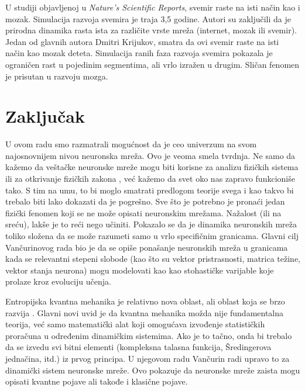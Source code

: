 \documentclass[a4paper]{article}
\begin{document}
U studiji objavljenoj u \textit{Nature’s Scientific Reports}, svemir raste na isti način kao i mozak. Simulacija razvoja svemira je traja 3,5 godine. Autori su zaključili da je prirodna dinamika rasta ista za različite vrste mreža (internet, mozak ili svemir). Jedan od glavnih autora Dmitri Krijukov, smatra da ovi svemir raste na isti način kao mozak deteta. Simulacija ranih faza razvoja svemira pokazala je ograničen rast u pojedinim segmentima, ali vrlo izražen u drugim. Sličan fenomen je prisutan u razvoju mozga. 

\section{Zaključak}

U ovom radu smo razmatrali mogućnost da je ceo univerzum na svom najosnovnijem nivou neuronska mreža. Ovo je veoma smela tvrdnja. Ne samo da kažemo da veštačke neuronske mreže mogu biti korisne za analizu fizičkih sistema \cite{2} ili za otkrivanje fizičkih zakona \cite{3}, već kažemo da svet oko nas zapravo funkcioniše tako. S tim na umu, to bi moglo smatrati predlogom teorije svega i kao takvo bi trebalo biti lako dokazati da je pogrešno. Sve što je potrebno je pronaći jedan fizički fenomen koji se ne može opisati neuronskim mrežama. Nažalost (ili na sreću), lakše je to reći nego učiniti. Pokazalo se da je dinamika neuronskih mreža toliko složena da se može razumeti samo u vrlo specifičnim granicama. Glavni cilj Vančurinovog rada bio je da se opiše ponašanje neuronskih mreža u granicama kada se relevantni stepeni slobode (kao što su vektor pristrasnosti, matrica težine, vektor stanja neurona) mogu modelovati kao kao stohastičke varijable koje prolaze kroz evoluciju učenja.

Entropijska kvantna mehanika je relativno nova \cite{4} oblast, ali oblast koja se brzo razvija \cite{5}. Glavni novi uvid je da kvantna mehanika možda nije fundamentalna teorija, već samo matematički alat koji omogućava izvođenje statističkih proračuna u određenim dinamičkim sistemima. Ako je to tačno, onda bi trebalo da se izvedu svi bitni elementi (kompleksna talasna funkcija, Šredingerova jednačina, itd.) iz prvog principa. U njegovom radu Vančurin radi upravo to za dinamički sistem neuronske mreže. Ovo pokazuje da neuronske mreže zaista mogu opisati kvantne pojave ali takođe i klasične pojave. 
\end{document}
